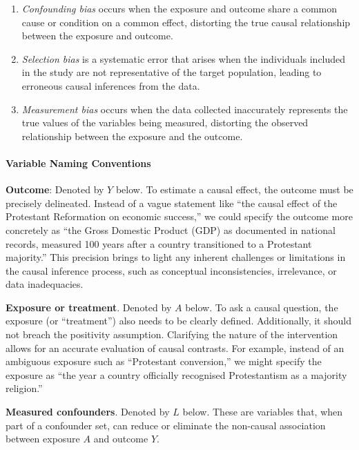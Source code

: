 \documentclass[
  singlecolumn]{article}
\let\oldparagraph\paragraph
\renewcommand{\paragraph}[1]{\oldparagraph{#1}\mbox{}}
\begin{document}
\begin{enumerate}
\def\labelenumi{\alph{enumi}.}
\item
  \emph{Confounding bias} occurs when the exposure and outcome share a
  common cause or condition on a common effect, distorting the true
  causal relationship between the exposure and outcome.
\item
  \emph{Selection bias} is a systematic error that arises when the
  individuals included in the study are not representative of the target
  population, leading to erroneous causal inferences from the data.
\item
  \emph{Measurement bias} occurs when the data collected inaccurately
  represents the true values of the variables being measured, distorting
  the observed relationship between the exposure and the outcome.
\end{enumerate}

\paragraph{\texorpdfstring{\textbf{Variable Naming
Conventions}}{Variable Naming Conventions}}\label{variable-naming-conventions}

\textbf{Outcome}: Denoted by \(Y\) below. To estimate a causal effect,
the outcome must be precisely delineated. Instead of a vague statement
like ``the causal effect of the Protestant Reformation on economic
success,'' we could specify the outcome more concretely as ``the Gross
Domestic Product (GDP) as documented in national records, measured 100
years after a country transitioned to a Protestant majority.'' This
precision brings to light any inherent challenges or limitations in the
causal inference process, such as conceptual inconsistencies,
irrelevance, or data inadequacies.

\textbf{Exposure or treatment}. Denoted by \(A\) below. To ask a causal
question, the exposure (or ``treatment'') also needs to be clearly
defined. Additionally, it should not breach the positivity assumption.
Clarifying the nature of the intervention allows for an accurate
evaluation of causal contrasts. For example, instead of an ambiguous
exposure such as ``Protestant conversion,'' we might specify the
exposure as ``the year a country officially recognised Protestantism as
a majority religion.''

\textbf{Measured confounders}. Denoted by \(L\) below. These are
variables that, when part of a confounder set, can reduce or eliminate
the non-causal association between exposure \(A\) and outcome \(Y\).
\end{document}
